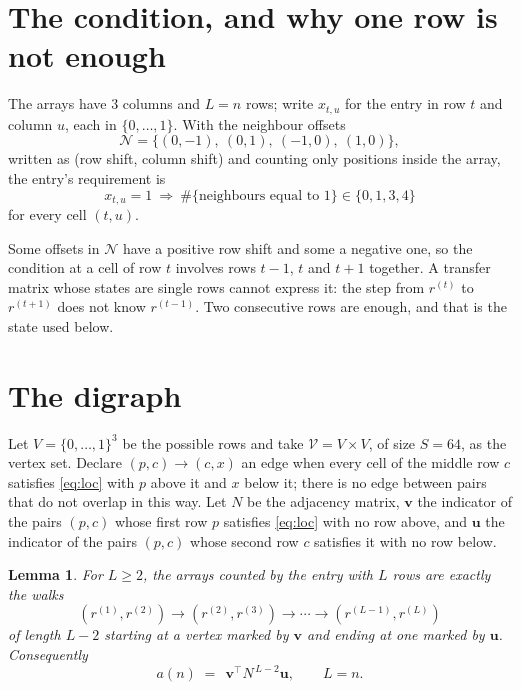 \documentclass[11pt,a4paper]{article}
\theoremstyle{plain}
\newtheorem{lemma}[theorem]{Lemma}
\theoremstyle{definition}
\begin{document}
\section{The condition, and why one row is not enough}

The arrays have $3$ columns and $L=n$ rows; write $x_{t,u}$ for the entry in
row $t$ and column $u$, each in $\{0,\dots,1\}$. With the neighbour offsets
\[
\mathcal N=\{(0,-1),\ (0,1),\ (-1,0),\ (1,0)\},
\]
written as (row shift, column shift) and counting only positions inside the array, the
entry's requirement is
\begin{equation}\label{eq:loc}
x_{t,u}=1\ \Rightarrow\ \#\{\text{neighbours equal to }1\}\in\{0,1,3,4\}
\end{equation}
for every cell $(t,u)$.

Some offsets in $\mathcal N$ have a positive row shift and some a negative one, so the
condition at a cell of row $t$ involves rows $t-1$, $t$ and $t+1$ together. A transfer
matrix whose states are single rows cannot express it: the step from $r^{(t)}$ to
$r^{(t+1)}$ does not know $r^{(t-1)}$. Two consecutive rows are enough, and that is
the state used below.

\section{The digraph}

Let $V=\{0,\dots,1\}^{3}$ be the possible rows and take
$\mathcal V=V\times V$, of size $S=64$, as the vertex set. Declare $(p,c)\to(c,x)$ an edge
when every cell of the middle row $c$ satisfies \eqref{eq:loc} with $p$ above it and $x$
below it; there is no edge between pairs that do not overlap in this way. Let $N$ be the
adjacency matrix, $\mathbf{v}$ the indicator of the pairs $(p,c)$ whose first row $p$
satisfies \eqref{eq:loc} with no row above, and $\mathbf{u}$ the indicator of
the pairs $(p,c)$ whose second row $c$ satisfies it with no row below.

\begin{lemma}\label{lem:walk}
For $L\ge2$, the arrays counted by the entry with $L$ rows are exactly the walks
\[
(r^{(1)},r^{(2)})\to(r^{(2)},r^{(3)})\to\cdots\to(r^{(L-1)},r^{(L)})
\]
of length $L-2$ starting at a vertex marked by $\mathbf{v}$ and ending at one marked by
$\mathbf{u}$. Consequently
\[
a(n)\;=\;\,\mathbf{v}^{\!\top}N^{\,L-2}\mathbf{u},\qquad L=n .
\]
\end{lemma}
\end{document}
